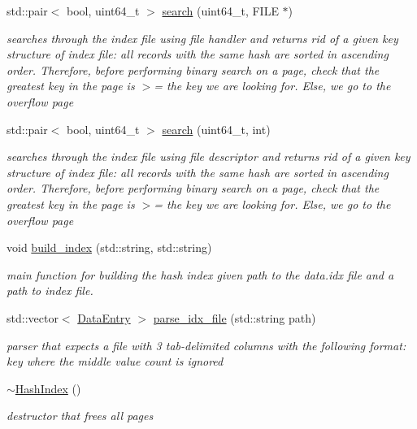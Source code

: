 \begin{DoxyCompactItemize}
\item 
std\+::pair$<$ bool, uint64\+\_\+t $>$ \hyperlink{class_hash_index_ac044690bf6e2f7cbf0aca62600cb355d}{search} (uint64\+\_\+t, F\+I\+L\+E $\ast$)
\begin{DoxyCompactList}\small\item\em searches through the index file using file handler and returns rid of a given key structure of index file\+: all records with the same hash are sorted in ascending order. Therefore, before performing binary search on a page, check that the greatest key in the page is $>$= the key we are looking for. Else, we go to the overflow page \end{DoxyCompactList}\item 
std\+::pair$<$ bool, uint64\+\_\+t $>$ \hyperlink{class_hash_index_a247ba4d9ac11792be1853eec5593ac1a}{search} (uint64\+\_\+t, int)
\begin{DoxyCompactList}\small\item\em searches through the index file using file descriptor and returns rid of a given key structure of index file\+: all records with the same hash are sorted in ascending order. Therefore, before performing binary search on a page, check that the greatest key in the page is $>$= the key we are looking for. Else, we go to the overflow page \end{DoxyCompactList}\item 
void \hyperlink{class_hash_index_a7d704988a35e8703feeefd9f2a5e68c8}{build\+\_\+index} (std\+::string, std\+::string)
\begin{DoxyCompactList}\small\item\em main function for building the hash index given path to the data.\+idx file and a path to index file. \end{DoxyCompactList}\item 
std\+::vector$<$ \hyperlink{class_data_entry}{Data\+Entry} $>$ \hyperlink{class_hash_index_af1027d9d3684c93abcc703ccd1824937}{parse\+\_\+idx\+\_\+file} (std\+::string path)
\begin{DoxyCompactList}\small\item\em parser that expects a file with 3 tab-\/delimited columns with the following format\+: key where the middle value count is ignored \end{DoxyCompactList}\item 
\hypertarget{class_hash_index_af8de8c5d009e19dc923f82e5e6cb4ae3}{}\hyperlink{class_hash_index_af8de8c5d009e19dc923f82e5e6cb4ae3}{$\sim$\+Hash\+Index} ()\label{class_hash_index_af8de8c5d009e19dc923f82e5e6cb4ae3}

\begin{DoxyCompactList}\small\item\em destructor that frees all pages \end{DoxyCompactList}\end{DoxyCompactItemize}
